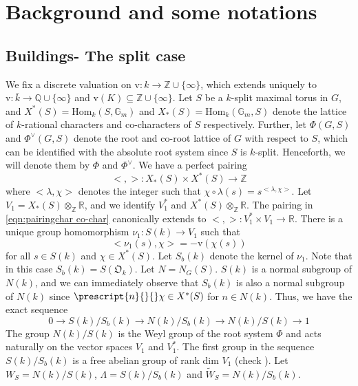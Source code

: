 \documentclass[11 pt]{article}
\numberwithin{equation}{subsection}
\theoremstyle{definition}
\theoremstyle{remark}
\theoremstyle{conjecture}
\newcommand{\rv}{\mathrm{v}}
\newcommand{\Hom}{\mathrm{Hom}}
\newcommand{\Z}{\mathbb Z}
\newcommand{\R}{\mathbb R}
\newcommand{\Q}{\mathbb Q}
\newcommand{\G}{\mathbb G}
\newcommand{\mf}{\mathfrak}
\begin{document}
\section{Background and some notations}\label{section: Background and notations}
 
\subsection{Buildings- The split case}
We fix a discrete valuation on $\rv:k \rightarrow \Z \cup \{\infty\}$, which extends uniquely to $\rv:\bar k\rightarrow\Q\cup \{\infty\}$ and $\rv(K) \subseteq \Z \cup \{\infty\}$. Let $S$ be a $k$-split maximal torus in $G$, and $X^*(S)= \Hom_k(S,\G_m)$ and $X_*(S)=\Hom_k(\G_m, S)$ denote the lattice of $k$-rational characters and co-characters of $S$ respectively. Further, let $\Phi(G,S)$ and $\Phi^\vee(G,S)$ denote the root and co-root lattice of $G$ with respect to $S$, which can be identified with the absolute root system since $S$ is $k$-split. Henceforth, we will denote them by $\Phi$ and $\Phi^\vee$. We have a perfect pairing 
\begin{equation}\label{eqn:pairingchar co-char}
  <,>:  X_*(S)\times X^*(S) \rightarrow \Z 
\end{equation}
where $<\lambda, \chi>$ denotes the integer such that $\chi \circ \lambda(s)= s^{<\lambda, \chi>}$. Let $V_1= X_*(S)\otimes_\Z \R$, and we identify $V_1^*$ and $X^*(S)\otimes_\Z \R$. The pairing in \eqref{eqn:pairingchar co-char} canonically extends to $<,>:V_1^*\times V_1\rightarrow \R$. There is a unique group homomorphism $\nu_1: S(k)\rightarrow V_1$ such that 
\begin{equation}\label{eqn:tranlation by torus}
    <\nu_1(s), \chi>= - \rv(\chi(s))
\end{equation}
for all $s\in S(k)$ and $\chi\in X^*(S)$. Let $S_b(k)$ denote the kernel of $\nu_1$. Note that in this case $S_b(k)=S(\mf O_k)$. Let $N=N_G(S)$. $S(k)$ is a normal subgroup of $N(k)$, and we can immediately observe that $S_b(k)$ is also a normal subgroup of $N(k)$ since $\prescript{n}{}{}\chi \in X^*(S)$ for $n \in N(k)$. Thus, we have the exact sequence 
\begin{equation*}
    0 \rightarrow S(k)/S_b(k) \rightarrow N(k)/ S_b(k) \rightarrow N(k)/S(k) \rightarrow 1
\end{equation*}
The group $N(k)/S(k)$ is the Weyl group of the root system $\Phi$ and acts naturally on the vector spaces $V_1$ and $V_1^*$. The first group in the sequence $S(k)/S_b(k)$ is a free abelian group of rank dim $V_1$ (check \cite[ Lemma 1.3 ]{landvogtcompactificationbook}). Let $W_S=N(k)/S(k)$, $\Lambda= S(k)/S_b(k)$ and $\widetilde W_S= N(k)/S_b(k)$. 
\end{document}

